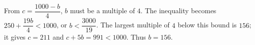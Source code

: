 From $c=\dfrac{1000-b}{4}$, $b$ must be a multiple of $4$. The inequality becomes $250+\dfrac{19b}{4}<1000$, or $b<\dfrac{3000}{19}$. The largest multiple of $4$ below this bound is $156$; it gives $c=211$ and $c+5b=991<1000$. Thus $b=\boxed{156}$.
